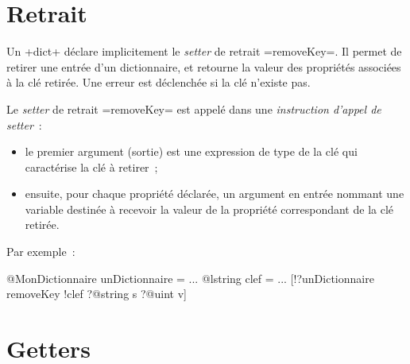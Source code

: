\section{Retrait}

Un \ggst+dict+ déclare implicitement le \emph{setter} de retrait \ggst=removeKey=. Il permet de retirer une entrée d'un dictionnaire, et retourne la valeur des propriétés associées à la clé retirée. Une erreur est déclenchée si la clé n'existe pas.



Le \emph{setter} de retrait \ggst=removeKey= est appelé dans une \emph{instruction d'appel de setter}~:
\begin{itemize}
  \item le premier argument (sortie) est une expression de type de la clé qui caractérise la clé à retirer~;
  \item ensuite, pour chaque propriété déclarée, un argument en entrée nommant une variable destinée à recevoir la valeur de la propriété correspondant de la clé retirée.
\end{itemize}

Par exemple~:
\begin{galgas3}
@MonDictionnaire unDictionnaire = {}
...
@lstring clef = ...
[!?unDictionnaire removeKey !clef ?@string s ?@uint v]
\end{galgas3}

\section{Getters}

%
%

